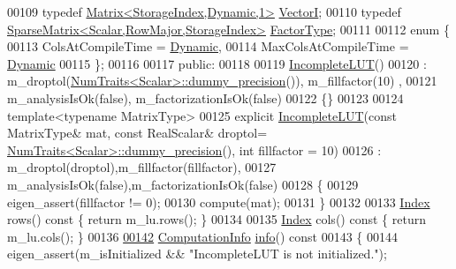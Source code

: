 \begin{DoxyCode}
00109     \textcolor{keyword}{typedef} \hyperlink{group___core___module}{Matrix<StorageIndex,Dynamic,1>} \hyperlink{group___core___module}{VectorI};
00110     \textcolor{keyword}{typedef} \hyperlink{group___sparse_core___module}{SparseMatrix<Scalar,RowMajor,StorageIndex>} 
      \hyperlink{group___sparse_core___module}{FactorType};
00111 
00112     \textcolor{keyword}{enum} \{
00113       ColsAtCompileTime = \hyperlink{namespace_eigen_ad81fa7195215a0ce30017dfac309f0b2}{Dynamic},
00114       MaxColsAtCompileTime = \hyperlink{namespace_eigen_ad81fa7195215a0ce30017dfac309f0b2}{Dynamic}
00115     \};
00116 
00117   \textcolor{keyword}{public}:
00118     
00119     \hyperlink{group___iterative_linear_solvers___module_class_eigen_1_1_incomplete_l_u_t}{IncompleteLUT}()
00120       : m\_droptol(\hyperlink{group___core___module_struct_eigen_1_1_num_traits}{NumTraits<Scalar>::dummy\_precision}()), m\_fillfactor(10)
      ,
00121         m\_analysisIsOk(\textcolor{keyword}{false}), m\_factorizationIsOk(\textcolor{keyword}{false})
00122     \{\}
00123     
00124     \textcolor{keyword}{template}<\textcolor{keyword}{typename} MatrixType>
00125     \textcolor{keyword}{explicit} \hyperlink{group___iterative_linear_solvers___module_class_eigen_1_1_incomplete_l_u_t}{IncompleteLUT}(\textcolor{keyword}{const} MatrixType& mat, \textcolor{keyword}{const} RealScalar& droptol=
      \hyperlink{group___core___module_struct_eigen_1_1_num_traits}{NumTraits<Scalar>::dummy\_precision}(), \textcolor{keywordtype}{int} fillfactor = 10)
00126       : m\_droptol(droptol),m\_fillfactor(fillfactor),
00127         m\_analysisIsOk(\textcolor{keyword}{false}),m\_factorizationIsOk(\textcolor{keyword}{false})
00128     \{
00129       eigen\_assert(fillfactor != 0);
00130       compute(mat); 
00131     \}
00132     
00133     \hyperlink{namespace_eigen_a62e77e0933482dafde8fe197d9a2cfde}{Index} rows()\textcolor{keyword}{ const }\{ \textcolor{keywordflow}{return} m\_lu.rows(); \}
00134     
00135     \hyperlink{namespace_eigen_a62e77e0933482dafde8fe197d9a2cfde}{Index} cols()\textcolor{keyword}{ const }\{ \textcolor{keywordflow}{return} m\_lu.cols(); \}
00136 
\hyperlink{group___iterative_linear_solvers___module_a941c7d34f15d7bc287e780636be0ee2b}{00142}     \hyperlink{group__enums_ga85fad7b87587764e5cf6b513a9e0ee5e}{ComputationInfo} \hyperlink{group___iterative_linear_solvers___module_a941c7d34f15d7bc287e780636be0ee2b}{info}()\textcolor{keyword}{ const}
00143 \textcolor{keyword}{    }\{
00144       eigen\_assert(m\_isInitialized && \textcolor{stringliteral}{"IncompleteLUT is not initialized."});

\end{DoxyCode}
